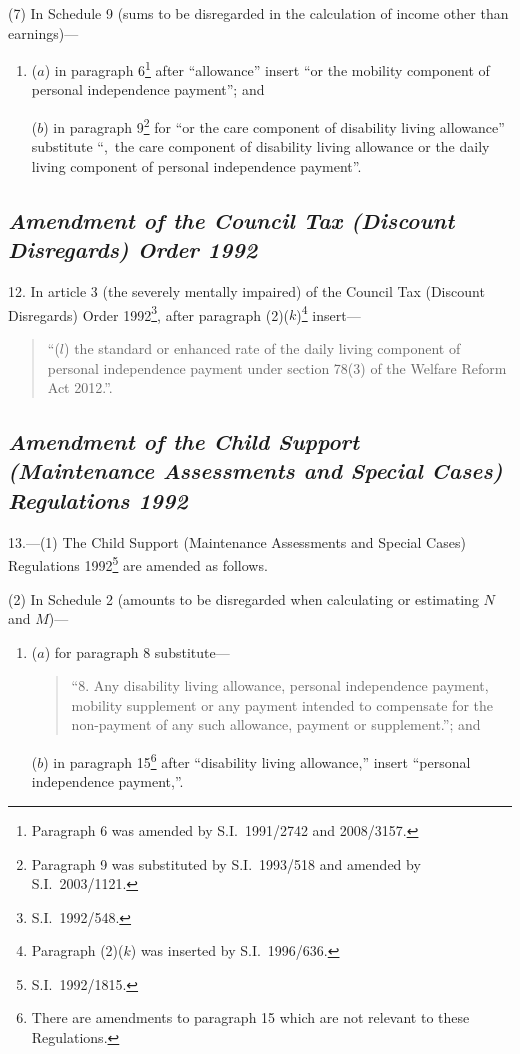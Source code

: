\documentclass[12pt,a4paper]{article}
\begin{document}
(7) In Schedule 9 (sums to be disregarded in the calculation of income other than earnings)—
\begin{enumerate}\item[]
($a$) in paragraph 6\footnote{Paragraph 6 was amended by S.I.~1991/2742 and 2008/3157.} after “allowance” insert “or the mobility component of personal independence payment”; and

($b$) in paragraph 9\footnote{Paragraph 9 was substituted by S.I.~1993/518 and amended by S.I.~2003/1121.} for “or the care component of disability living allowance” substitute “,~the care component of disability living allowance or the daily living component of personal independence payment”.
\end{enumerate}

\subsection*{\itshape Amendment of the Council Tax (Discount Disregards) Order 1992}

12.  In article 3 (the severely mentally impaired) of the Council Tax (Discount Disregards) Order 1992\footnote{S.I.~1992/548.}, after paragraph (2)($k$)\footnote{Paragraph (2)($k$)  was inserted by S.I.~1996/636.} insert—
\begin{quotation}
“($l$) the standard or enhanced rate of the daily living component of personal independence payment under section 78(3) of the Welfare Reform Act 2012.”.
\end{quotation}

\subsection*{\itshape Amendment of the Child Support (Maintenance Assessments and Special Cases) Regulations 1992}

13.—(1) The Child Support (Maintenance Assessments and Special Cases) Regulations 1992\footnote{S.I.~1992/1815.} are amended as follows.

(2) In Schedule 2 (amounts to be disregarded when calculating or estimating $N$ and $M$)—
\begin{enumerate}\item[]
($a$) for paragraph 8 substitute—
\begin{quotation}
“8.  Any disability living allowance, personal independence payment, mobility supplement or any payment intended to compensate for the non-payment of any such allowance, payment or supplement.”; and
\end{quotation}

($b$) in paragraph 15\footnote{There are amendments to paragraph 15 which are not relevant to these Regulations.} after “disability living allowance,” insert “personal independence payment,”.
\end{enumerate}
\end{document}
